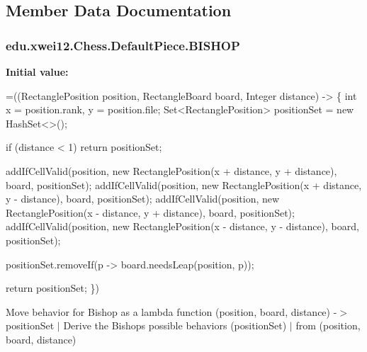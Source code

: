 \subsection{Member Data Documentation}
\subsubsection[{\texorpdfstring{B\+I\+S\+H\+OP}{BISHOP}}]{\setlength{\rightskip}{0pt plus 5cm}edu.\+xwei12.\+Chess.\+Default\+Piece.\+B\+I\+S\+H\+OP}\hypertarget{enumedu_1_1xwei12_1_1_chess_1_1_default_piece_a126cf1ab581b587e90738827ef4f7782}{}\label{enumedu_1_1xwei12_1_1_chess_1_1_default_piece_a126cf1ab581b587e90738827ef4f7782}
{\bfseries Initial value\+:}
\begin{DoxyCode}
=((RectanglePosition position, RectangleBoard board, Integer distance) -> \{
        \textcolor{keywordtype}{int} x = position.rank, y = position.file;
        Set<RectanglePosition> positionSet = \textcolor{keyword}{new} HashSet<>();

        
        \textcolor{keywordflow}{if} (distance < 1) \textcolor{keywordflow}{return} positionSet;

        
        addIfCellValid(position, \textcolor{keyword}{new} RectanglePosition(x + distance, y + distance), board, positionSet);
        addIfCellValid(position, \textcolor{keyword}{new} RectanglePosition(x + distance, y - distance), board, positionSet);
        addIfCellValid(position, \textcolor{keyword}{new} RectanglePosition(x - distance, y + distance), board, positionSet);
        addIfCellValid(position, \textcolor{keyword}{new} RectanglePosition(x - distance, y - distance), board, positionSet);

        
        positionSet.removeIf(p -> board.needsLeap(position, p));

        \textcolor{keywordflow}{return} positionSet;
    \})
\end{DoxyCode}
Move behavior for Bishop as a lambda function (position, board, distance) -\/$>$ position\+Set $\vert$ Derive the Bishop\textquotesingle{}s possible behaviors (position\+Set) $\vert$ from (position, board, distance) 
